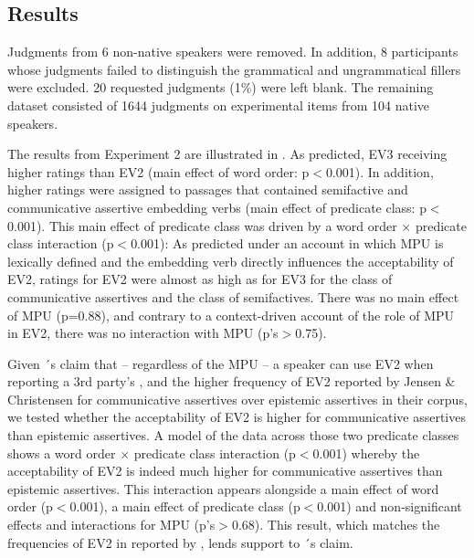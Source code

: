 \documentclass[output=paper]{langsci/langscibook}
\begin{document}
\subsection{Results}
Judgments from 6 non-native  speakers were removed.  In addition, 8 participants whose judgments failed to distinguish the grammatical and ungrammatical fillers were excluded.  20 requested judgments (1\%) were left blank. The remaining dataset consisted of 1644 judgments on experimental items from 104 native speakers.

The results from Experiment 2 are illustrated in .  As predicted, EV3 receiving higher ratings than EV2 (main effect of word order:  p$<$0.001).  In addition, higher ratings were assigned to passages that contained semifactive and communicative assertive embedding verbs (main effect of predicate class: p$<$0.001). This main effect of predicate class was driven by a word order $\times$ predicate class interaction (p$<$0.001): As predicted under an account in which MPU is lexically defined and the embedding verb directly influences the acceptability of EV2, ratings for EV2 were almost as high as for EV3 for the class of communicative assertives and the class of semifactives.  There was no main effect of MPU (p=0.88), and contrary to a context-driven account of the role of MPU in EV2, there was no interaction with MPU (p's$>$0.75).

Given \citeauthor{Julien2009}´s claim that -- regardless of the MPU -- a speaker can use EV2 when reporting a 3rd party's , and the higher frequency of EV2  reported by Jensen \& Christensen for communicative assertives over epistemic assertives in their  corpus, we tested whether the acceptability of EV2 is higher for communicative assertives than epistemic assertives. A model of the data across those two predicate classes shows a word order $\times$ predicate class interaction (p$<$0.001) whereby the acceptability of EV2 is indeed much higher for communicative assertives than epistemic assertives.  This interaction appears alongside a main effect of word order (p$<$0.001), a main effect of predicate class (p$<$0.001) and non-significant effects and interactions for MPU (p's$>$0.68). This result, which matches the frequencies of EV2 in  reported by \citeauthor{JensenChristensen2013}, lends support to \citeauthor{Julien2009}´s claim.
\end{document}
